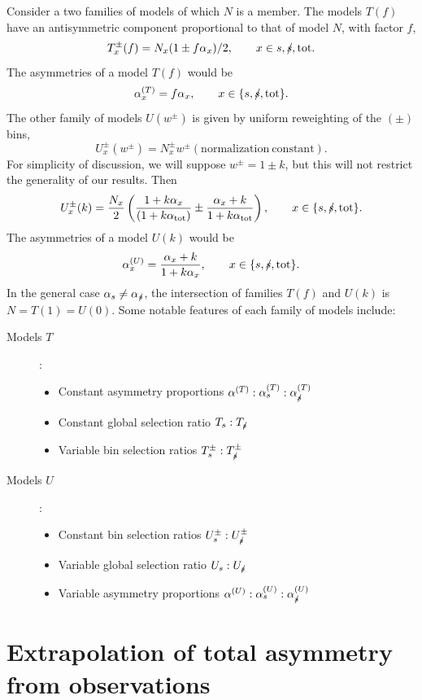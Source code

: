 \documentclass[letterpaper,11pt]{article}
\newcommand{\selected}{{\ensuremath s}}
\newcommand{\unselected}{{\ensuremath\slash\!\!\!\selected}}
\newcommand{\tot}{{\ensuremath\mathrm{tot}}}
\begin{document}
Consider a two families of models of which $N$ is a member.  The
models $T(f)$ have an antisymmetric component proportional to that of
model $N$, with factor $f$,
\[T_x^{\pm}(f) = N_x(1\pm f\alpha_x)/2,\qquad x\in{\selected,\unselected,\tot}.\]
The asymmetries of a model $T(f)$ would be
\[\alpha_x^{(T)}=f\alpha_x, \qquad x\in\{\selected,\unselected,\tot\}.\]
The other family of models $U(w^\pm)$ is given by uniform reweighting
of the $(\pm)$ bins,
\[U_x^\pm(w^\pm) = N_x^\pm w^\pm(\mathrm{normalization\ constant}).\]
For simplicity of discussion, we will suppose $w^\pm=1\pm k$, but this
will not restrict the generality of our results.  Then
\[U_x^\pm(k) = \frac{N_x}{2}\left(\frac{1+k\alpha_x}{(1+k\alpha_\tot)}\pm\frac{\alpha_x+k}{1+k\alpha_\tot}\right), \qquad x\in\{\selected,\unselected,\tot\}.\]
The asymmetries of a model $U(k)$ would be
\[\alpha_x^{(U)} = \frac{\alpha_x+k}{1+k\alpha_x}, \qquad x\in\{\selected,\unselected,\tot\}.\]
In the general case $\alpha_\selected\ne\alpha_\unselected$, the
intersection of families $T(f)$ and $U(k)$ is $N=T(1)=U(0)$.  Some
notable features of each family of models include:
\begin{description}
\item[Models $T$]:
  \begin{itemize}
  \item Constant asymmetry proportions $\alpha^{(T)}:\alpha^{(T)}_\selected:\alpha^{(T)}_\unselected$
  \item Constant global selection ratio $T_\selected:T_\unselected$
  \item Variable bin selection ratios $T^\pm_\selected:T^\pm_\unselected$
  \end{itemize}
\item[Models $U$]:
  \begin{itemize}
  \item Constant bin selection ratios $U^\pm_\selected:U^\pm_\unselected$
  \item Variable global selection ratio $U_\selected:U_\unselected$
  \item Variable asymmetry proportions $\alpha^{(U)}:\alpha^{(U)}_\selected:\alpha^{(U)}_\unselected$
  \end{itemize}
\end{description}


\section{Extrapolation of total asymmetry from observations}
\end{document}
